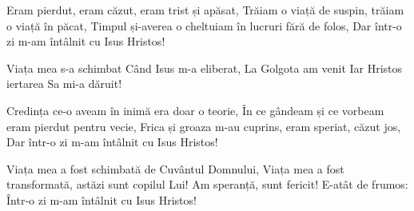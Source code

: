 \beginverse
Eram pierdut, eram căzut, eram trist și apăsat,
Trăiam o viață de suspin, trăiam o viață în păcat,
Timpul și-averea o cheltuiam în lucruri fără de folos,
Dar într-o zi m-am întâlnit cu Isus Hristos!
\endverse

\beginchorus
Viața mea s-a schimbat
Când Isus m-a eliberat,
La Golgota am venit
Iar Hristos iertarea Sa mi-a dăruit!
\endchorus

\beginverse
Credința ce-o aveam în inimă era doar o teorie,
În ce gândeam și ce vorbeam eram pierdut pentru vecie,
Frica și groaza m-au cuprins, eram speriat, căzut jos,
Dar într-o zi m-am întâlnit cu Isus Hristos!
\endverse

\beginverse
Viața mea a fost schimbată de Cuvântul Domnului,
Viața mea a fost transformată, astăzi sunt copilul Lui!
Am speranță, sunt fericit! E-atât de frumos:
Într-o zi m-am întâlnit cu Isus Hristos!
\endverse
\endsong